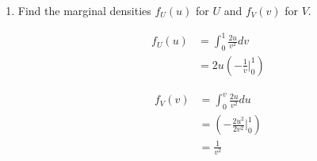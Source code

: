 \documentclass{article}
\newcommand{\1}{\mathbf{1}}
\begin{document}
\begin{enumerate}
    \item Find the marginal densities $f_U(u)$ for $U$ and  $f_V(v)$ for $V$.
    
    \begin{align*}
    f_{U}(u) &= \int_0^1 \frac{2u}{v^2} dv \\
    &= 2u \left(-\frac{1}{v}\bigg|_0^1\right) 
    \end{align*}
     
    \begin{align*}
    f_{V}(v) &= \int_0^v \frac{2u}{v^2} du \\
    &= \left(-\frac{2u^2}{2v^2}\bigg|_0^1\right) \\
    &= \frac{1}{v^2}
    \end{align*}
     
\end{enumerate}
\end{document}
